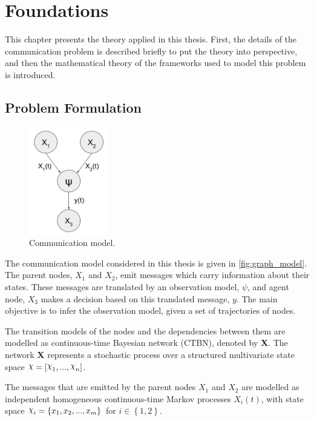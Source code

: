 \chapter{Foundations}
\label{chap:2}

This chapter presents the theory applied in this thesis. First, the details of the communication problem is described briefly to put the theory into perspective, and then the mathematical theory of the frameworks used to model this problem is introduced. 

\section{Problem Formulation}
\label{sec:prob_formulation}
\begin{figure}
	\begin{center}
		\includegraphics[width=3.5cm]{figures/simple_graph}
		\caption{Communication model.}
	\end{center}
	\label{fig:graph_model}
\end{figure} 
The communication model considered in this thesis is given in \autoref{fig:graph_model}. The parent nodes, $X_{1}$ and $ X_{2}$, emit messages which carry information about their states. These messages are translated by an observation model, $\psi$, and agent node, $ X_{3} $ makes a decision based on this translated message, $ y $. The main objective is to infer the observation model, given a set of trajectories of nodes.

The transition models of the nodes and the dependencies between them are modelled as continuous-time Bayesian network (CTBN), denoted by \textbf{X}. The network \textbf{X} represents a stochastic process over a structured multivariate state space $ \rchi = [\rchi_1,..., \rchi_n] $. 

The messages that are emitted by the parent nodes $X_{1}$ and $ X_{2} $ are modelled as independent homogeneous continuous-time Markov processes $X_{i}(t)$, with state space $ \rchi_{i} = \left\lbrace x_{1}, x_{2}, ..., x_{m} \right\rbrace  $ for $ i \in \left\lbrace 1,2 \right\rbrace $.

